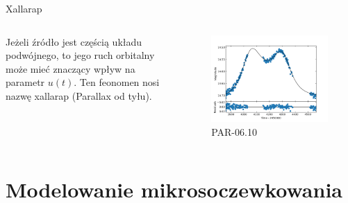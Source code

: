 \documentclass{beamer}
\begin{document}
\begin{frame}{Xallarap}
    \begin{columns}
        \begin{column}{0.5\linewidth}
            Jeżeli źródło jest częścią układu podwójnego, to jego ruch orbitalny może mieć znaczący wpływ na parametr $u(t)$.
            Ten feonomen nosi nazwę xallarap (Parallax od tyłu)\cite{Xallarap_paper}.
        \end{column}
        \begin{column}{0.5\linewidth}
            \begin{figure}
                \centering
                \includegraphics[width = \textwidth]{../sim30/xallarap/png/PAR-06-noaver.dat.10.png}
                \caption*{\tiny{PAR-06.10}}
            \end{figure}
        \end{column}
    \end{columns}
\end{frame}

\section{Modelowanie mikrosoczewkowania}
\end{document}
